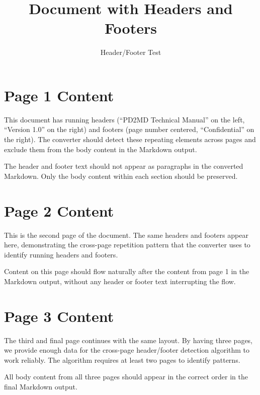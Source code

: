 \documentclass[12pt]{article}
\title{Document with Headers and Footers}
\author{Header/Footer Test}
\begin{document}
\maketitle
\thispagestyle{fancy}

\section{Page 1 Content}
This document has running headers (``PD2MD Technical Manual'' on the left,
``Version 1.0'' on the right) and footers (page number centered, ``Confidential''
on the right). The converter should detect these repeating elements across pages
and exclude them from the body content in the Markdown output.

The header and footer text should not appear as paragraphs in the converted
Markdown. Only the body content within each section should be preserved.

\newpage
\section{Page 2 Content}
This is the second page of the document. The same headers and footers appear
here, demonstrating the cross-page repetition pattern that the converter uses
to identify running headers and footers.

Content on this page should flow naturally after the content from page 1 in the
Markdown output, without any header or footer text interrupting the flow.

\newpage
\section{Page 3 Content}
The third and final page continues with the same layout. By having three pages,
we provide enough data for the cross-page header/footer detection algorithm to
work reliably. The algorithm requires at least two pages to identify patterns.

All body content from all three pages should appear in the correct order in the
final Markdown output.
\end{document}
